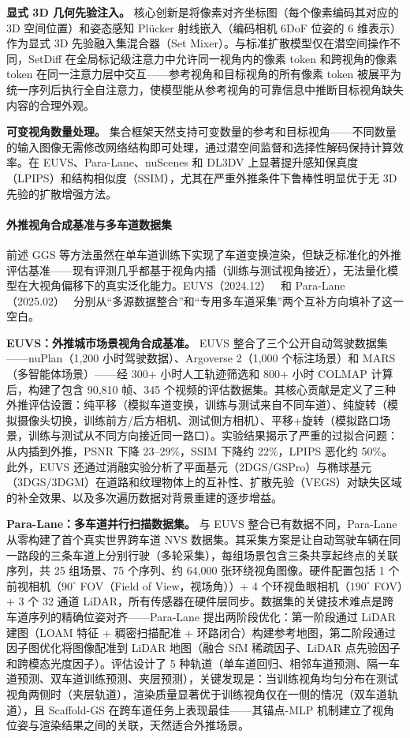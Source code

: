 \textbf{显式 3D 几何先验注入。} 核心创新是将像素对齐坐标图（每个像素编码其对应的 3D 空间位置）和姿态感知 Pl\"ucker 射线嵌入（编码相机 6DoF 位姿的 6 维表示）作为显式 3D 先验融入集混合器（Set Mixer）。与标准扩散模型仅在潜空间操作不同，SetDiff 在全局标记级注意力中允许同一视角内的像素 token 和跨视角的像素 token 在同一注意力层中交互——参考视角和目标视角的所有像素 token 被展平为统一序列后执行全自注意力，使模型能从参考视角的可靠信息中推断目标视角缺失内容的合理外观。

\textbf{可变视角数量处理。} 集合框架天然支持可变数量的参考和目标视角——不同数量的输入图像无需修改网络结构即可处理，通过潜空间监督和选择性解码保持计算效率。在 EUVS、Para-Lane、nuScenes 和 DL3DV 上显著提升感知保真度（LPIPS）和结构相似度（SSIM），尤其在严重外推条件下鲁棒性明显优于无 3D 先验的扩散增强方法。

\paragraph{外推视角合成基准与多车道数据集}

前述 GGS 等方法虽然在单车道训练下实现了车道变换渲染，但缺乏标准化的外推评估基准——现有评测几乎都基于视角内插（训练与测试视角接近），无法量化模型在大视角偏移下的真实泛化能力。EUVS（2024.12）~\cite{2412_05256} 和 Para-Lane（2025.02）~\cite{2502_15635} 分别从``多源数据整合''和``专用多车道采集''两个互补方向填补了这一空白。

\textbf{EUVS：外推城市场景视角合成基准。} EUVS 整合了三个公开自动驾驶数据集——nuPlan（1,200 小时驾驶数据）、Argoverse 2（1,000 个标注场景）和 MARS（多智能体场景）——经 300+ 小时人工轨迹筛选和 800+ 小时 COLMAP 计算后，构建了包含 90,810 帧、345 个视频的评估数据集。其核心贡献是定义了三种外推评估设置：纯平移（模拟车道变换，训练与测试来自不同车道）、纯旋转（模拟摄像头切换，训练前方/后方相机、测试侧方相机）、平移+旋转（模拟路口场景，训练与测试从不同方向接近同一路口）。实验结果揭示了严重的过拟合问题：从内插到外推，PSNR 下降 23--29\%，SSIM 下降约 22\%，LPIPS 恶化约 50\%。此外，EUVS 还通过消融实验分析了平面基元（2DGS/GSPro）与椭球基元（3DGS/3DGM）在道路和纹理物体上的互补性、扩散先验（VEGS）对缺失区域的补全效果、以及多次遍历数据对背景重建的逐步增益。

\textbf{Para-Lane：多车道并行扫描数据集。} 与 EUVS 整合已有数据不同，Para-Lane 从零构建了首个真实世界跨车道 NVS 数据集。其采集方案是让自动驾驶车辆在同一路段的三条车道上分别行驶（多轮采集），每组场景包含三条共享起终点的关联序列，共 25 组场景、75 个序列、约 64,000 张环绕视角图像。硬件配置包括 1 个前视相机（$90^\circ$ FOV（Field of View，视场角））+ 4 个环视鱼眼相机（$190^\circ$ FOV）+ 3 个 32 通道 LiDAR，所有传感器在硬件层同步。数据集的关键技术难点是跨车道序列的精确位姿对齐——Para-Lane 提出两阶段优化：第一阶段通过 LiDAR 建图（LOAM 特征 + 稠密扫描配准 + 环路闭合）构建参考地图，第二阶段通过因子图优化将图像配准到 LiDAR 地图（融合 SfM 稀疏因子、LiDAR 点先验因子和跨模态光度因子）。评估设计了 5 种轨道（单车道回归、相邻车道预测、隔一车道预测、双车道训练预测、夹层预测），关键发现是：当训练视角均匀分布在测试视角两侧时（夹层轨道），渲染质量显著优于训练视角仅在一侧的情况（双车道轨道），且 Scaffold-GS 在跨车道任务上表现最佳——其锚点-MLP 机制建立了视角位姿与渲染结果之间的关联，天然适合外推场景。

